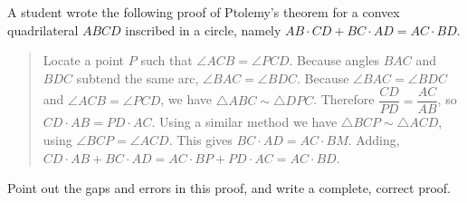 A student wrote the following proof of Ptolemy's theorem for a convex quadrilateral $ABCD$ inscribed in a circle, namely $AB\cdot CD+BC\cdot AD=AC\cdot BD$.

\begin{quote}
Locate a point $P$ such that $\angle ACB=\angle PCD$. Because angles $BAC$ and $BDC$ subtend the same arc, $\angle BAC=\angle BDC$. Because $\angle BAC=\angle BDC$ and $\angle ACB=\angle PCD$, we have $\triangle ABC\sim\triangle DPC$. Therefore $\dfrac{CD}{PD}=\dfrac{AC}{AB}$, so $CD\cdot AB=PD\cdot AC$. Using a similar method we have $\triangle BCP\sim\triangle ACD$, using $\angle BCP=\angle ACD$. This gives $BC\cdot AD=AC\cdot BM$. Adding, $CD\cdot AB+BC\cdot AD=AC\cdot BP+PD\cdot AC=AC\cdot BD$.
\end{quote}
Point out the gaps and errors in this proof, and write a complete, correct proof.
